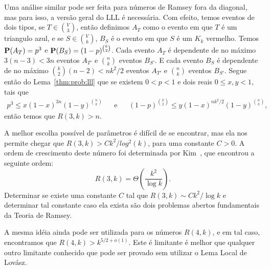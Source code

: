 Uma análise similar pode ser feita para números de Ramsey fora da diagonal, mas para isso, a versão geral do LLL é necessária. Com efeito, temos eventos de dois tipos, se $T \in \binom{V}{3}$, então definimos $A_T$ como o evento em que $T$ é um triangulo azul, e se $S \in \binom{V}{k}$, $B_S$ é o evento em que $S$ é um $K_k$ vermelho.
Temos $\operatorname{\mathbf{P}}(A_T) = p^3$ e $\operatorname{\mathbf{P}}(B_S) = (1-p)^{\binom{k}{2}}$.
Cada evento $A_T$ é dependente de no máximo $3(n-3) < 3n$ eventos $A_{T'}$ e $\binom{n}{k}$ eventos $B_{S'}$. E cada evento $B_S$ é dependente de no máximo $\binom{k}{2}(n-2) < nk^2/2$ eventos $A_{T'}$ e $\binom{n}{k}$ eventos $B_{S'}$.
Segue então do Lema~\ref{thm:prob:lll} que se existem $0 < p < 1$ e dois reais $0 \leq x,y < 1$, tais que
\begin{align*} p^3 \leq x(1-x)^{3n}(1-y)^{\binom{n}{k}} && \text{e} &&
(1-p)^{\binom{k}{2}} \leq y(1-x)^{nk^2/2}(1-y)^{\binom{n}{k}},
\end{align*}
então temos que $R(3,k) > n$.

A melhor escolha possível de parâmetros é difícil de se encontrar, mas ela nos permite chegar que $R(3,k) > Ck^2/log^2(k)$, para uma constante $C > 0$. A ordem de crescimento deste número foi determinada por Kim~\cite{kim1995ramsey}, que encontrou a seguinte ordem:
\[ R(3,k) = \Theta\left( \frac{k^2}{\log k}\right). \]
Determinar se existe uma constante $C$ tal que $R(3,k) \sim Ck^2 / \log k$ e determinar tal constante caso ela exista são dois problemas abertos fundamentais da Teoria de Ramsey.

A mesma idéia ainda pode ser utilizada para os números $R(4,k)$, e em tal caso, encontramos que $R(4,k) > k^{5/2 + o(1)}$. Este é limitante é melhor que qualquer outro limitante conhecido que pode ser provado sem utilizar o Lema Local de Lovász.

